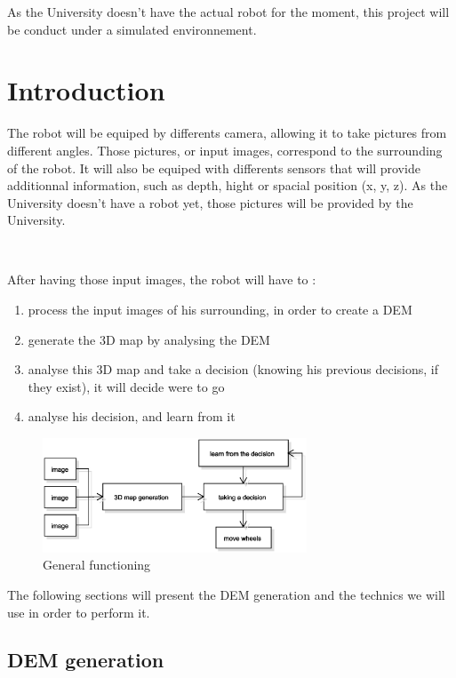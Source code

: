 \documentclass[11pt,a4paper]{article}
\begin{document}
As the University doesn't have the actual robot for the moment, this project will be conduct under a simulated environnement. 


\section{Introduction}

The robot will be equiped by differents camera, allowing it to take pictures from different angles. Those pictures, or input images, correspond to the surrounding of the robot. It will also be equiped with differents sensors that will provide additionnal information, such as depth, hight or spacial position (x, y, z). As the University doesn't have a robot yet, those pictures will be provided by the University. 

~~

After having those input images, the robot will have to : 
\begin{enumerate}
	\item process the input images of his surrounding, in order to create a \gls{DEM} 
	\item generate the 3D map by analysing the \gls{DEM} 
	\item analyse this 3D map and take a decision (knowing his previous decisions, if they exist), it will decide were to go
	\item analyse his decision, and learn from it 
\end{enumerate}


\begin{figure}[H]
	\centering
	\includegraphics[width=0.7\textwidth]{images/diagrammes/flowchart_general}
	\caption{General functioning}
	\label{fig:diagram:general functioning}	
\end{figure}

The following sections will present the \gls{DEM} generation and the technics we will use in order to perform it. 


\subsection{DEM generation}
\end{document}

